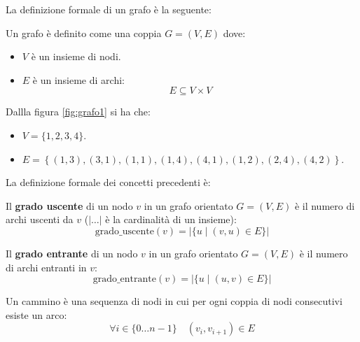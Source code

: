 \documentclass[a4paper]{article}
\begin{document}
\vspace{1em}
\noindent
La definizione formale di un grafo è la seguente:
\begin{definition}
  Un grafo è definito come una coppia $G = (V, E)$ dove:
  \begin{itemize}
    \item $V$ è un insieme di nodi.
    \item $E$ è un insieme di archi:
      \[
        E \subseteq V \times V
      \] 
  \end{itemize}
\end{definition}
Dallla figura \ref{fig:grafo1} si ha che:
\begin{itemize}
  \item $V = \{1, 2, 3, 4\}$.
  \item $E = \left\{(1, 3), (3,1), (1,1), (1,4), (4,1), (1,2), (2,4), (4,2)\right\}$.
\end{itemize}
La definizione formale dei concetti precedenti è:
\begin{definition}
  Il \textbf{grado uscente} di un nodo $v$ in un grafo orientato $G = (V, E)$ è il numero
  di archi uscenti da $v$ (\( |\ldots| \) è la cardinalità di un insieme):
  \[
    \text{grado\_uscente}(v) = \left|\{u \;|\; (v, u) \in E\}\right|
  \]
\end{definition}
\begin{definition}
  Il \textbf{grado entrante} di un nodo $v$ in un grafo orientato $G = (V, E)$ è il numero
  di archi entranti in $v$:
  \[
    \text{grado\_entrante}(v) = \left|\{u \;|\; (u, v) \in E\}\right|
  \]
\end{definition}
\begin{definition}
  Un cammino è una sequenza di nodi in cui per ogni coppia di nodi consecutivi esiste un arco:
  \[
    \forall i \in \{0 \ldots n-1\} \quad (v_i, v_{i+1}) \in E
  \] 
\end{definition}
\end{document}
